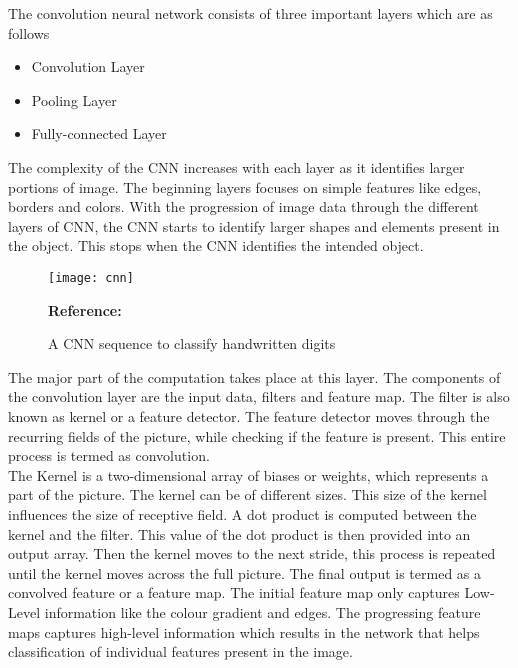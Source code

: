 The convolution neural network consists of three important layers which are as follows
\begin{itemize}
	\item	Convolution Layer
	\item	Pooling Layer
	\item	Fully-connected Layer
\end{itemize}
	
The complexity of the CNN increases with each layer as it identifies larger portions of image. The beginning layers focuses on simple features like edges, borders and colors. With the progression of image data through the different layers of CNN, the CNN starts to identify larger shapes and elements present in the object. This stops when the CNN identifies the intended object. \autocite{Education:2020}

\begin{figure}  [H]
	\begin{center}
		\texttt{[image: cnn]}
		\caption{A CNN sequence to classify handwritten digits} 
		\label{fig:A CNN sequence to classify handwritten digits}
		\footnotesize \textbf{Reference:} \autocite{KE:2022}
	\end{center}
\end{figure}



The major part of the computation takes place at this layer. The components of the convolution layer are the input data, filters and feature map. The filter is also known as kernel or a feature detector. The feature detector moves through the recurring fields of the picture, while checking if the feature is present. This entire process is termed as convolution.\\

The Kernel is a two-dimensional array of biases or weights, which represents a part of the picture. The kernel can be of different sizes. This size of the kernel influences the size of receptive field. A dot product is computed between the kernel and the filter. This value of the dot product is then provided into an output array. Then the kernel moves to the next stride, this process is repeated until the kernel moves across the full picture. The final output is termed as a convolved feature or a feature map. The initial feature map only captures Low-Level information like the colour gradient and edges. The progressing feature maps captures high-level information which results in the network that helps classification of individual features present in the image. \autocite{Education:2020}

